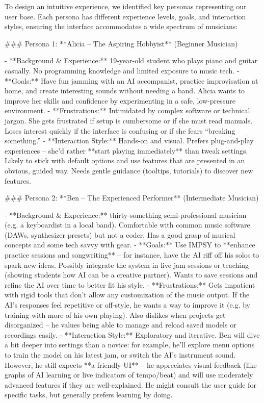 To design an intuitive experience, we identified key personas representing our user base. Each persona has different experience levels, goals, and interaction styles, ensuring the interface accommodates a wide spectrum of musicians:

### Persona 1: **Alicia – The Aspiring Hobbyist** (Beginner Musician)

- **Background & Experience:** 19-year-old student who plays piano and guitar casually. No programming knowledge and limited exposure to music tech.
- **Goals:** Have fun jamming with an AI accompanist, practice improvisation at home, and create interesting sounds without needing a band. Alicia wants to improve her skills and confidence by experimenting in a safe, low-pressure environment.
- **Frustrations:** Intimidated by complex software or technical jargon. She gets frustrated if setup is cumbersome or if she must read manuals. Loses interest quickly if the interface is confusing or if she fears “breaking something.”
- **Interaction Style:** Hands-on and visual. Prefers plug-and-play experiences – she’d rather **start playing immediately** than tweak settings. Likely to stick with default options and use features that are presented in an obvious, guided way. Needs gentle guidance (tooltips, tutorials) to discover new features.

### Persona 2: **Ben – The Experienced Performer** (Intermediate Musician)

- **Background & Experience:** thirty-something semi-professional musician (e.g. a keyboardist in a local band). Comfortable with common music software (DAWs, synthesizer presets) but not a coder. Has a good grasp of musical concepts and some tech savvy with gear.
- **Goals:** Use IMPSY to **enhance practice sessions and songwriting** – for instance, have the AI riff off his solos to spark new ideas. Possibly integrate the system in live jam sessions or teaching (showing students how AI can be a creative partner). Wants to save sessions and refine the AI over time to better fit his style.
- **Frustrations:** Gets impatient with rigid tools that don’t allow any customization of the music output. If the AI’s responses feel repetitive or off-style, he wants a way to improve it (e.g. by training with more of his own playing). Also dislikes when projects get disorganized – he values being able to manage and reload saved models or recordings easily.
- **Interaction Style:** Exploratory and iterative. Ben will dive a bit deeper into settings than a novice: for example, he’ll explore menu options to train the model on his latest jam, or switch the AI’s instrument sound. However, he still expects **a friendly UI** – he appreciates visual feedback (like graphs of AI learning or live indicators of tempo/beat) and will use moderately advanced features if they are well-explained. He might consult the user guide for specific tasks, but generally prefers learning by doing.

